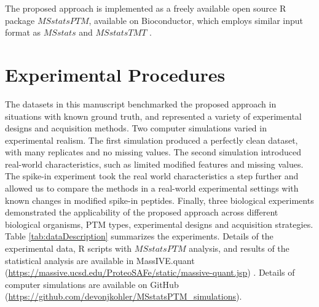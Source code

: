 \documentclass[mcp]{article}
\numberwithin{table}{section}
\begin{document}
The proposed approach is implemented as a freely available open source R package $MSstatsPTM$, available on Bioconductor, which employs similar input format as $MSstats$ and $MSstatsTMT$ \cite{Choi:2014,Huang:2020}.

\section{Experimental Procedures}

The datasets in this manuscript  benchmarked the proposed approach in situations with known ground truth, and represented a variety of experimental designs and acquisition methods. Two computer simulations varied in experimental realism. The first simulation produced a perfectly clean dataset, with many replicates and no missing values. The second simulation introduced real-world characteristics, such as limited modified features and missing values. The spike-in experiment took the real world characteristics a step further and allowed us to compare the methods in a real-world experimental settings with known changes in modified spike-in peptides. Finally, three biological experiments demonstrated the applicability of the proposed approach across different biological organisms, PTM types, experimental designs and acquisition strategies. Table \ref{tab:dataDescription} summarizes the experiments. Details of the experimental data, R scripts with $MSstatsPTM$ analysis, and results of the statistical analysis are available in MassIVE.quant (\url{https://massive.ucsd.edu/ProteoSAFe/static/massive-quant.jsp}) \cite{Choi:2020}. Details of computer simulations are available on GitHub (\url{https://github.com/devonjkohler/MSstatsPTM_simulations}).
\end{document}
